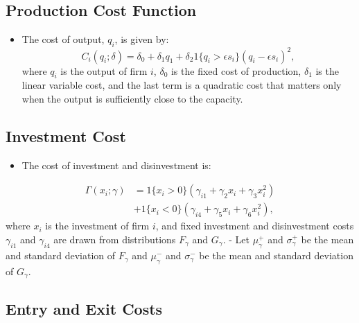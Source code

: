 \documentclass[
]{book}
\providecommand{\tightlist}{%
  \setlength{\itemsep}{0pt}\setlength{\parskip}{0pt}}
\begin{document}
\hypertarget{production-cost-function}{%
\subsection{Production Cost Function}\label{production-cost-function}}

\begin{itemize}
\tightlist
\item
  The cost of output, \(q_i\), is given by: \begin{equation}
  C_i(q_i; \delta) = \delta_0 + \delta_1 q_1 + \delta_2 1\{q_i > \epsilon s_i\}(q_i - \epsilon s_i)^2,
  \end{equation} where \(q_i\) is the output of firm \(i\), \(\delta_0\) is
  the fixed cost of production, \(\delta_1\) is the linear variable
  cost, and the last term is a quadratic cost that matters only when
  the output is sufficiently close to the capacity.
\end{itemize}

\hypertarget{investment-cost}{%
\subsection{Investment Cost}\label{investment-cost}}

\begin{itemize}
\tightlist
\item
  The cost of investment and disinvestment is:
\end{itemize}

\begin{equation}
\begin{split}
\Gamma(x_i; \gamma) &= 1\{x_i > 0\}(\gamma_{i1} + \gamma_2 x_i + \gamma_3 x_i^2)\\
& + 1\{x_i < 0\}(\gamma_{i4} + \gamma_{5} x_i + \gamma_6 x_i^2),
\end{split}
\end{equation} where \(x_i\) is the investment of firm \(i\), and fixed
investment and disinvestment costs \(\gamma_{i1}\) and \(\gamma_{i4}\) are
drawn from distributions \(F_{\gamma}\) and \(G_{\gamma}\).
- Let
\(\mu_\gamma^+\) and \(\sigma_\gamma^+\) be the mean and standard deviation
of \(F_\gamma\) and \(\mu_\gamma^-\) and \(\sigma_\gamma^-\) be the mean and
standard deviation of \(G_\gamma\).

\hypertarget{entry-and-exit-costs}{%
\subsection{Entry and Exit Costs}\label{entry-and-exit-costs}}
\end{document}
